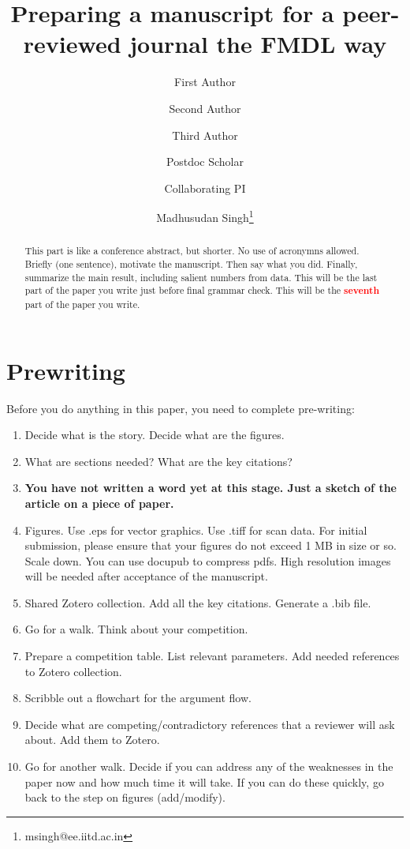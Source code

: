 \documentclass[12 pt]{article}
\title{Preparing a manuscript for a peer-reviewed journal the FMDL way}
\author[1]{\small First Author} %
\author[2]{\small Second Author}  %
\author[1]{\small Third Author}  %
\author[1]{\small Postdoc Scholar}  %
\author[2]{\small Collaborating PI}  %
\author[1]{\small Madhusudan Singh\thanks{msingh@ee.iitd.ac.in}}  %
\affil[1]{\footnotesize Functional Materials \& Devices Laboratory, Department of Electrical Engineering, IIT Delhi, New Delhi, NCT, India, 110 016.} %
\affil[2]{\footnotesize Department of Chemistry, IIT Delhi, New Delhi, NCT, India, 110 016.} %
\date{} %
\begin{document}
\maketitle %

\begin{abstract}
This part is like a conference abstract, but shorter. No use of acronymns allowed. Briefly (one sentence), motivate the manuscript. Then say what you did. Finally, summarize the main result, including salient numbers from data. This will be the last part of the paper you write just before final grammar check. This will be the \textbf{\Huge \textcolor{red}{seventh}} part of the paper you write.
\end{abstract}

\linenumbers %


\section{Prewriting}

Before you do anything in this paper, you need to complete pre-writing:

\begin{enumerate}
\item Decide what is the story. Decide what are the figures.
\item What are sections needed? What are the key citations?
\item \textbf{You have not written a word yet at this stage. Just a sketch of the article on a piece of paper.}
\item Figures. Use .eps for vector graphics. Use .tiff for scan data. For initial submission, please ensure that your figures do not exceed 1 MB in size or so. Scale down. You can use docupub to compress pdfs. High resolution images will be needed after acceptance of the manuscript.
\item Shared Zotero collection. Add all the key citations. Generate a .bib file.
\item Go for a walk. Think about your competition.
\item Prepare a competition table. List relevant parameters. Add needed references to Zotero collection.
\item Scribble out a flowchart for the argument flow.
\item Decide what are competing/contradictory references that a reviewer will ask about. Add them to Zotero.
\item Go for another walk. Decide if you can address any of the weaknesses in the paper now and how much time it will take. If you can do these quickly, go back to the step on figures (add/modify).
\end{enumerate}
\end{document}
